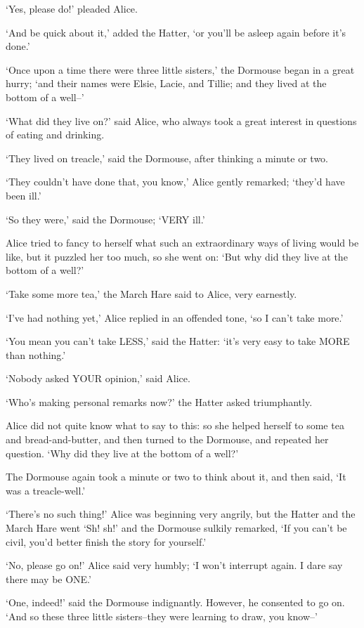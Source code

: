 \documentclass[12pt]{book}
\begin{document}
  `Yes, please do!' pleaded Alice.

  `And be quick about it,' added the Hatter, `or you'll be asleep
again before it's done.'

  `Once upon a time there were three little sisters,' the
Dormouse began in a great hurry; `and their names were Elsie,
Lacie, and Tillie; and they lived at the bottom of a well--'

  `What did they live on?' said Alice, who always took a great
interest in questions of eating and drinking.

  `They lived on treacle,' said the Dormouse, after thinking a
minute or two.

  `They couldn't have done that, you know,' Alice gently
remarked; `they'd have been ill.'

  `So they were,' said the Dormouse; `VERY ill.'

  Alice tried to fancy to herself what such an extraordinary ways
of living would be like, but it puzzled her too much, so she went
on:  `But why did they live at the bottom of a well?'

  `Take some more tea,' the March Hare said to Alice, very
earnestly.

  `I've had nothing yet,' Alice replied in an offended tone, `so
I can't take more.'

  `You mean you can't take LESS,' said the Hatter:  `it's very
easy to take MORE than nothing.'

  `Nobody asked YOUR opinion,' said Alice.

  `Who's making personal remarks now?' the Hatter asked
triumphantly.

  Alice did not quite know what to say to this:  so she helped
herself to some tea and bread-and-butter, and then turned to the
Dormouse, and repeated her question.  `Why did they live at the
bottom of a well?'

  The Dormouse again took a minute or two to think about it, and
then said, `It was a treacle-well.'

  `There's no such thing!'  Alice was beginning very angrily, but
the Hatter and the March Hare went `Sh! sh!' and the Dormouse
sulkily remarked, `If you can't be civil, you'd better finish the
story for yourself.'

  `No, please go on!' Alice said very humbly; `I won't interrupt
again.  I dare say there may be ONE.'

  `One, indeed!' said the Dormouse indignantly.  However, he
consented to go on.  `And so these three little sisters--they
were learning to draw, you know--'
\end{document}
